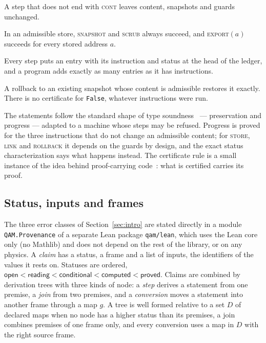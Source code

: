 \begin{theorem}
A step that does not end with \textsc{cont} leaves content, snapshots and guards unchanged.
\end{theorem}

\begin{theorem}
In an admissible store, \textsc{snapshot} and \textsc{scrub} always succeed, and \textsc{export}\((a)\) succeeds for every stored address \(a\).
\end{theorem}

\begin{theorem}
Every step puts an entry with its instruction and status at the head of the ledger, and a program adds exactly as many entries as it has
instructions.
\end{theorem}

\begin{theorem}
A rollback to an existing snapshot whose content is admissible restores it exactly.  There is no certificate for \texttt{False}, whatever
instructions were run.
\end{theorem}

The statements follow the standard shape of type soundness~\cite{wright,pierce} --- preservation and progress --- adapted to a machine whose
steps may be refused.  Progress is proved for the three instructions that do not change an admissible content; for \textsc{store},
\textsc{link} and \textsc{rollback} it depends on the guards by design, and the exact status characterization says what happens instead.
The certificate rule is a small instance of the idea behind proof-carrying code~\cite{necula}: what is certified carries its proof.

\subsection{Status, inputs and frames}

The three error classes of Section~\ref{sec:intro} are stated directly in a module \texttt{QAM.Provenance} of a separate Lean package
\texttt{qam/lean}, which uses the Lean core only (no Mathlib) and does not depend on the rest of the library, or on any physics.  A \emph{claim} has a status, a frame and a list of inputs, the identifiers of the values it rests
on.  Statuses are ordered, \(\textsf{open}<\textsf{reading}<\textsf{conditional}<\textsf{computed}<\textsf{proved}\).  Claims are combined by
derivation trees with three kinds of node: a \emph{step} derives a statement from one premise, a \emph{join} from two premises, and a
\emph{conversion} moves a statement into another frame through a map \(g\).  A tree is well formed relative to a set \(D\) of declared maps
when no node has a higher status than its premises, a join combines premises of one frame only, and every conversion uses a map in \(D\)
with the right source frame.

